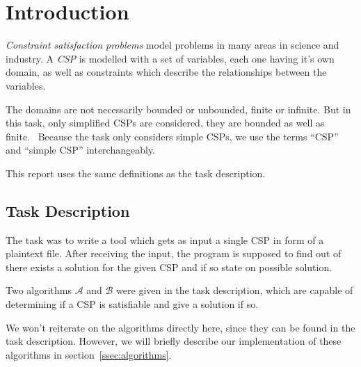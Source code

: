 \section{Introduction}


\emph{Constraint satisfaction problems} model problems in many areas in science and industry.
A \emph{CSP} is modelled with a set of variables, each one having it's own domain, as well as constraints which describe the relationships between the variables.~\cite{MF19}

The domains are not necessarily bounded or unbounded, finite or infinite.
But in this task, only simplified CSPs are considered, they are bounded as well as finite.~\cite{MF19}
Because the task only considers simple CSPs, we use the terms ``CSP'' and ``simple CSP'' interchangeably.

This report uses the same definitions as the task description.

\subsection{Task Description}

The task was to write a tool which gets as input a single CSP in form of a plaintext file.
After receiving the input, the program is supposed to find out of there exists a solution for the given CSP and if so state on possible solution.

Two algorithms $\mathcal{A}$ and $\mathcal{B}$ were given in the task description, which are capable of determining if a CSP is satisfiable and give a solution if so.

We won't reiterate on the algorithms directly here, since they can be found in the task description.
However, we will briefly describe our implementation of these algorithms in section~\ref{ssec:algorithms}.
